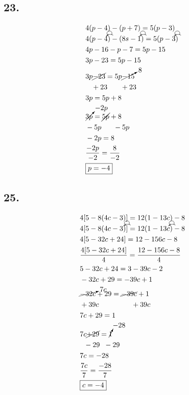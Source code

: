 \documentclass{article}
\newcommand{\tikzmark}[1]{\tikz[overlay,remember picture] \node (#1) {};}
\newcommand{\DrawBox}[2]{%
    \begin{tikzpicture}[overlay,remember picture]
        \draw[->,shorten >=5pt,shorten <=5pt,out=70,in=130,distance=0.5cm,#1] (MarkA.north) to (MarkC.north);
        \draw[->,shorten >=5pt,shorten <=5pt,out=50,in=140,distance=0.3cm,#2] (MarkA.north) to (MarkB.north);
    \end{tikzpicture}
}
\begin{document}
    \subsection*{23.}
    \begin{align*}
        & 4(p - 4) - (p + 7) = 5(p - 3) \\
        & \tikzmark{MarkA}4 (p\tikzmark{MarkB} - 4\tikzmark{MarkC})\DrawBox{black}{black} -\tikzmark{MarkA} (8s\tikzmark{MarkB} - 1\tikzmark{MarkC})\DrawBox{black}{black} = \tikzmark{MarkA}5 (p\tikzmark{MarkB} - 3\tikzmark{MarkC})\DrawBox{black}{black} \\
        & 4p - 16 -p -7 = 5p - 15\\
        & 3p - 23 = 5p - 15\\
        & 3p \cancel{- 23} = 5p \cancelto{8}{-15} \\
        & \hspace{.3cm}+ 23 \hspace{.65cm}+ 23 \\
        & 3p = 5p + 8 \\
        & \cancelto{-2p}{3p} = \cancel{5p} + 8 \\
        & -5p \hspace{.6cm} - 5p\\
        & -2p = 8 \\
        & \frac{- 2p}{-2} = \frac{8}{- 2} \\
        & \boxed{p = -4}
    \end{align*}

    \subsection*{25.}
    \begin{align*}
        & 4[5 - 8 (4c - 3)] = 12(1 - 13c) - 8 \\
        & 4[5 -8\tikzmark{MarkA} (4c\tikzmark{MarkB} - 3\tikzmark{MarkC})]\DrawBox{black}{black} = \tikzmark{MarkA}12 (1\tikzmark{MarkB} - 13c\tikzmark{MarkC})\DrawBox{black}{black} - 8\\
        & 4[5 -32c + 24] = 12 - 156c - 8\\
        & \frac{4[5 -32c + 24]}{4} = \frac{12 - 156c - 8}{4}\\
        & 5 -32c + 24 = 3 -39c -2 \\
        & -32c + 29 = -39c + 1\\
        & \cancelto{7c}{-32c} + 29 = \cancel{-39c} + 1 \\
        & + 39c \hspace{1.6cm} + 39c \\
        & 7c + 29 = 1 \\
        & 7c \cancel{+ 29} = \cancelto{-28}{1} \\
        & \hspace{.2cm} - 29 \hspace{.2cm}- 29\\
        & 7c = -28 \\
        & \frac{7c}{7} = \frac{-28}{7} \\
        & \boxed{c = -4}
    \end{align*}
\end{document}
